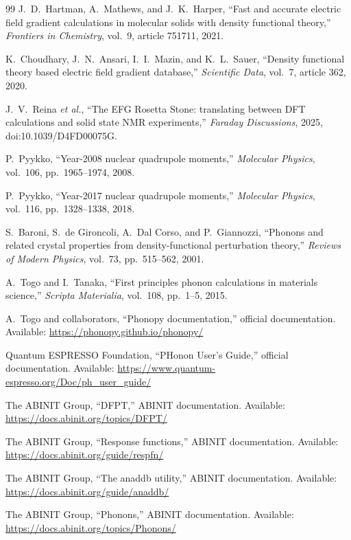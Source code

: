 \documentclass[11pt]{article}
\begin{document}
\begin{thebibliography}{99}
J.~D.~Hartman, A.~Mathews, and J.~K.~Harper, ``Fast and accurate electric field gradient calculations in molecular solids with density functional theory,'' \emph{Frontiers in Chemistry}, vol.~9, article 751711, 2021.

K.~Choudhary, J.~N.~Ansari, I.~I.~Mazin, and K.~L.~Sauer, ``Density functional theory based electric field gradient database,'' \emph{Scientific Data}, vol.~7, article 362, 2020.

J.~V.~Reina \emph{et al.}, ``The EFG Rosetta Stone: translating between DFT calculations and solid state NMR experiments,'' \emph{Faraday Discussions}, 2025, doi:10.1039/D4FD00075G.

P.~Pyykko, ``Year-2008 nuclear quadrupole moments,'' \emph{Molecular Physics}, vol.~106, pp.~1965--1974, 2008.

P.~Pyykko, ``Year-2017 nuclear quadrupole moments,'' \emph{Molecular Physics}, vol.~116, pp.~1328--1338, 2018.

S.~Baroni, S.~de Gironcoli, A.~Dal Corso, and P.~Giannozzi, ``Phonons and related crystal properties from density-functional perturbation theory,'' \emph{Reviews of Modern Physics}, vol.~73, pp.~515--562, 2001.

A.~Togo and I.~Tanaka, ``First principles phonon calculations in materials science,'' \emph{Scripta Materialia}, vol.~108, pp.~1--5, 2015.

A.~Togo and collaborators, ``Phonopy documentation,'' official documentation. Available: \url{https://phonopy.github.io/phonopy/}

Quantum ESPRESSO Foundation, ``PHonon User's Guide,'' official documentation. Available: \url{https://www.quantum-espresso.org/Doc/ph_user_guide/}

The ABINIT Group, ``DFPT,'' ABINIT documentation. Available: \url{https://docs.abinit.org/topics/DFPT/}

The ABINIT Group, ``Response functions,'' ABINIT documentation. Available: \url{https://docs.abinit.org/guide/respfn/}

The ABINIT Group, ``The anaddb utility,'' ABINIT documentation. Available: \url{https://docs.abinit.org/guide/anaddb/}

The ABINIT Group, ``Phonons,'' ABINIT documentation. Available: \url{https://docs.abinit.org/topics/Phonons/}


\end{thebibliography}
\end{document}

